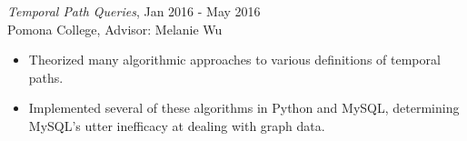 {\sl Temporal Path Queries}, \hfill Jan 2016 - May 2016 \\
Pomona College, Advisor: Melanie Wu
\begin{itemize} \itemsep -2pt
  \item Theorized many algorithmic approaches to various definitions of temporal paths.
  \item Implemented several of these algorithms in Python and MySQL, determining
    MySQL's utter inefficacy at dealing with graph data.
\end{itemize}
